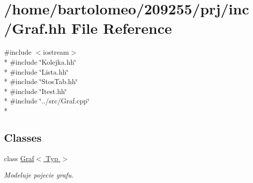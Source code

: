 \hypertarget{_graf_8hh}{\section{/home/bartolomeo/209255/prj/inc/\-Graf.hh File Reference}
\label{_graf_8hh}
}
{\ttfamily \#include $<$iostream$>$}\\*
{\ttfamily \#include \char`\"{}Kolejka.\-hh\char`\"{}}\\*
{\ttfamily \#include \char`\"{}Lista.\-hh\char`\"{}}\\*
{\ttfamily \#include \char`\"{}Stos\-Tab.\-hh\char`\"{}}\\*
{\ttfamily \#include \char`\"{}Itest.\-hh\char`\"{}}\\*
{\ttfamily \#include \char`\"{}../src/\-Graf.\-cpp\char`\"{}}\\*
\subsection*{Classes}
\begin{DoxyCompactItemize}
\item 
class \hyperlink{class_graf}{Graf$<$ Typ $>$}
\begin{DoxyCompactList}\small\item\em Modeluje pojecie grafu. \end{DoxyCompactList}\end{DoxyCompactItemize}
